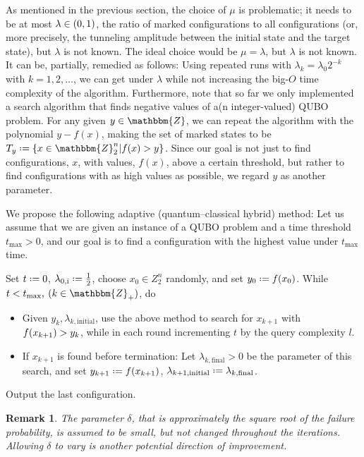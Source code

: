 \documentclass[reqno, 10pt]{amsart}
\numberwithin{equation}{section}                %
\let\originalleft\left
\let\originalright\right
\renewcommand{\left}{\mathopen{}\mathclose\bgroup\originalleft}
\renewcommand{\right}{\aftergroup\egroup\originalright}
\def\({\mathopen{}\left(}
\def\){\right)\mathclose{}}
\newcommand*{\eqdef}{\mathrel{\vcenter{\baselineskip0.5ex \lineskiplimit0pt\hbox{.}\hbox{.}}}=}
\newtheorem{remark}[theorem]{Remark}
\def\Z{\mathbbm{Z}}
\begin{document}
As mentioned in the previous section, the choice of $\mu$ is problematic; it needs to be at most $\lambda \in \( 0, 1 \)$, the ratio of marked configurations to all configurations (or, more precisely, the tunneling amplitude between the initial state and the target state), but $\lambda$ is not known. The ideal choice would be $\mu = \lambda$, but $\lambda$ is not known. It can be, partially, remedied as follows: Using repeated runs with $\lambda_k = \lambda_0 2^{- k}$ with $k = 1, 2, \ldots$, we can get under $\lambda$ while not increasing the big-$O$ time complexity of the algorithm. Furthermore, note that so far we only implemented a search algorithm that finds negative values of a(n integer-valued) QUBO problem. For any given $y \in \Z$, we can repeat the algorithm with the polynomial $y - f(x)$, making the set of marked states to be $T_y \eqdef \{ x \in \Z_2^n | f(x) > y \}$. Since our goal is not just to find configurations, $x$, with values, $f(x)$, above a certain threshold, but rather to find configurations with as high values as possible, we regard $y$ as another parameter.

\smallskip

We propose the following adaptive (quantum--classical hybrid) method: Let us assume that we are given an instance of a QUBO problem and a time threshold $t_{\max} > 0$, and our goal is to find a configuration with the highest value under $t_{\max}$ time.

Set $t \eqdef 0$, $\lambda_{0, \mathrm{i}} \eqdef \tfrac{1}{2}$, choose $x_0 \in Z_2^n$ randomly, and set $y_0 \eqdef f \( x_0 \)$. While $t < t_{\max}, \: (k \in \Z_+)$, do
\begin{itemize}
   \item[] Given $y_k, \lambda_{k, \mathrm{initial}}$, use the above method to search for $x_{k + 1}$ with $f \( x_{k + 1} \) > y_k$, while in each round incrementing $t$ by the query complexity $l$.
   
   \item[] If $x_{k + 1}$ is found before termination: Let $\lambda_{k, \mathrm{final}} > 0$ be the parameter of this search, and set $y_{k + 1} \eqdef f \( x_{k + 1} \)$, $\lambda_{k + 1, \mathrm{initial}} \eqdef \lambda_{k, \mathrm{final}}$.
\end{itemize}
Output the last configuration.

\smallskip

\begin{remark}
   The parameter $\delta$, that is approximately the square root of the failure probability, is assumed to be small, but not changed throughout the iterations. Allowing $\delta$ to vary is another potential direction of improvement.
\end{remark}
\end{document}
